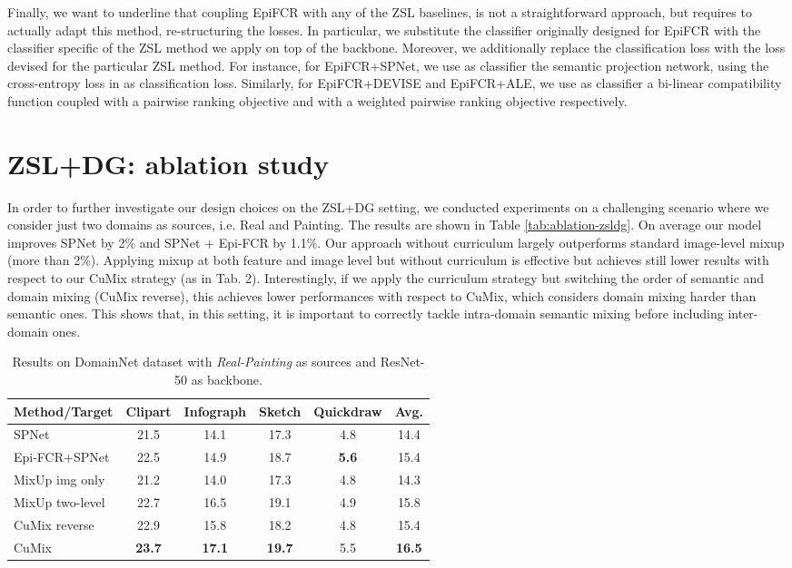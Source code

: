 \documentclass[runningheads]{llncs}
\begin{document}
Finally, we want to underline that coupling EpiFCR with any of the ZSL baselines, is not a straightforward approach, but requires to actually adapt this method, re-structuring the losses. In particular, we substitute the classifier originally designed for EpiFCR with the classifier specific of the ZSL method we apply on top of the backbone. Moreover, we additionally replace the classification loss with the loss devised for the particular ZSL method. For instance, for EpiFCR+SPNet, we use as classifier the semantic projection network, using the cross-entropy loss in \cite{xian2019semantic} as classification loss. Similarly, for EpiFCR+DEVISE and EpiFCR+ALE, we use as classifier a bi-linear compatibility function \cite{xian2018zeroshotgood} coupled with a pairwise ranking objective \cite{frome2013devise} and with a weighted pairwise ranking objective \cite{akata2013label} respectively. 
\section{ZSL+DG: ablation study}
In order to further investigate our design choices on the ZSL+DG setting, we conducted experiments on a challenging scenario where we consider just two domains as sources, i.e. Real and Painting. The results are shown in Table \ref{tab:ablation-zsldg}. On average our model improves SPNet by 2\% and SPNet + Epi-FCR by 1.1\%. Our approach without curriculum largely outperforms standard image-level mixup \cite{zhang2017mixup} (more than 2\%). Applying mixup at both feature and image level but without curriculum is effective but achieves still lower results with respect to our CuMix strategy (as in Tab. 2).  Interestingly, if we apply the curriculum strategy but switching the order of semantic and domain mixing (CuMix reverse), this achieves lower performances with respect to CuMix, which considers domain mixing harder than semantic ones. This shows that, in this setting, it is important to correctly tackle intra-domain semantic mixing before including inter-domain ones.
 
 \begin{table*}[t]
           \label{tab:ablation-zsldg}
 			\caption{Results on DomainNet dataset with \textit{Real-Painting} as sources and ResNet-50 as backbone.} 
 			 		\centering
 		\begin{tabular}{ l | c  c  c  c | c}
 		Method/Target & Clipart& Infograph& Sketch& Quickdraw& Avg.\\\hline 
 SPNet& 21.5& 14.1& 17.3& 4.8& 14.4\\
 Epi-FCR+SPNet& 22.5& 14.9& 18.7& \textbf{5.6}& 15.4\\
 \hline
 MixUp img only & 21.2& 14.0& 17.3& 4.8& 14.3\\
 MixUp two-level& 22.7& 16.5& 19.1& 4.9& 15.8\\
 CuMix reverse& 22.9& 15.8& 18.2& 4.8& 15.4\\
 \hline
 CuMix & \textbf{23.7}& \textbf{17.1}& \textbf{19.7}& {5.5}& \textbf{16.5} \\
 		\end{tabular}
 		\label{tab:ablation-study-pacs}
 \end{table*}
 
\end{document}
